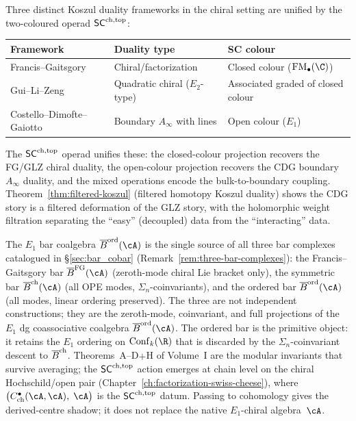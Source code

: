 \begin{remark}
\label{rem:three-koszul-dualities}
Three distinct Koszul duality frameworks in the chiral setting are unified by the two-coloured operad $\mathsf{SC}^{\mathrm{ch},\mathrm{top}}$:
\begin{center}
\renewcommand{\arraystretch}{1.15}
\begin{tabular}{@{}lll@{}}
\toprule
\textbf{Framework} & \textbf{Duality type} & \textbf{SC colour} \\
\midrule
Francis--Gaitsgory \cite{FG12} & Chiral/factorization & Closed colour ($\FM_\bullet(\C)$) \\
Gui--Li--Zeng \cite{GLZ22} & Quadratic chiral ($E_2$-type) & Associated graded of closed colour \\
Costello--Dimofte--Gaiotto \cite{CDG20} & Boundary $A_\infty$ with lines & Open colour ($E_1$) \\
\bottomrule
\end{tabular}
\end{center}
The $\mathsf{SC}^{\mathrm{ch},\mathrm{top}}$ operad unifies these: the closed-colour projection recovers the FG/GLZ chiral duality, the open-colour projection recovers the CDG boundary $A_\infty$ duality, and the mixed operations encode the bulk-to-boundary coupling. Theorem~\ref{thm:filtered-koszul} (filtered homotopy Koszul duality) shows the CDG story is a filtered deformation of the GLZ story, with the holomorphic weight filtration separating the ``easy'' (decoupled) data from the ``interacting'' data.
\end{remark}

\begin{remark}
\label{rem:sc-three-bar-connection}%
%
%
The $E_1$ bar coalgebra $\barB^{\mathrm{ord}}(\cA)$ is the
single source of all three bar complexes catalogued in
\S\ref{sec:bar_cobar}
(Remark~\ref{rem:three-bar-complexes}):
the Francis--Gaitsgory bar $\barB^{\mathrm{FG}}(\cA)$
(zeroth-mode chiral Lie bracket only), the symmetric bar
$\barBch(\cA)$ (all OPE modes, $\Sigma_n$-coinvariants), and
the ordered bar $\barB^{\mathrm{ord}}(\cA)$
(all modes, linear ordering preserved). The three are
not independent constructions; they are the zeroth-mode,
coinvariant, and full projections of the
$E_1$ dg coassociative coalgebra
$\barB^{\mathrm{ord}}(\cA)$. The
ordered bar is the primitive object: it retains the
$E_1$ ordering on $\Conf_k(\R)$ that is discarded by the
$\Sigma_n$-coinvariant descent to $\overline{B}^{\mathrm{ch}}$. Theorems~A--D$+$H
of Volume~I are the modular invariants that survive averaging;
the $\mathsf{SC}^{\mathrm{ch},\mathrm{top}}$ action emerges at chain level on the chiral
Hochschild/open pair (Chapter~\ref{ch:factorization-swiss-cheese}),
where
$\bigl(C^\bullet_{\mathrm{ch}}(\cA,\cA),\; \cA\bigr)$
is the $\mathsf{SC}^{\mathrm{ch},\mathrm{top}}$ datum. Passing to cohomology gives the derived-centre
shadow; it does not replace the native $E_1$-chiral algebra~$\cA$.
\end{remark}


